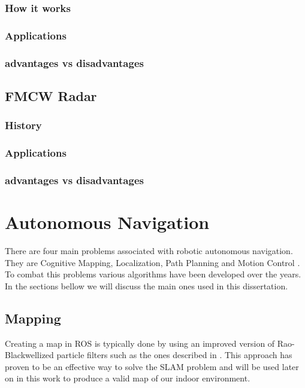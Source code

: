 \subsubsection{How it works}

\subsubsection{Applications}
\subsubsection{advantages vs disadvantages}

\subsection{FMCW Radar}

\subsubsection{History}
\subsubsection{Applications}
\subsubsection{advantages vs disadvantages}



\section {Autonomous Navigation}
There are four main problems associated with robotic autonomous navigation. They are Cognitive Mapping, Localization, Path Planning and Motion Control \cite{baranov2014}. To combat this problems various algorithms have been developed over the years. In the sections bellow we will discuss the main ones used in this dissertation.

\subsection{Mapping}

Creating a map in ROS is typically done by using an improved version of  Rao-Blackwellized particle filters such as the ones described in \cite{grisetti2007improved}. This approach has proven to be an effective way to solve the \ac{SLAM} problem and will be used later on in this work to produce a valid map of our indoor environment.
